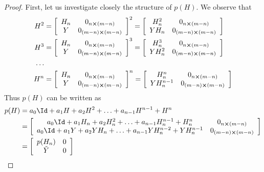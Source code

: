 \begin{proof}
	First, let us investigate closely the structure of \(p(H)\). We observe that
	\begin{align*}
		H^2 &= \left[\begin{array}{cc}
			H_n & 0_{n\cross(m-n)} \\
			Y & 0_{(m-n)\cross(m-n)}
			\end{array}\right]^2 = 
			\left[\begin{array}{cc}
				H_n^2 & 0_{n\cross(m-n)} \\
				Y H_n & 0_{(m-n)\cross(m-n)}
			\end{array}\right]\\
		H^3 &=
			\left[\begin{array}{cc}
				H_n & 0_{n\cross(m-n)} \\
				Y & 0_{(m-n)\cross(m-n)}
			\end{array}\right]^3 = 
			\left[\begin{array}{cc}
				H_n^3 & 0_{n\cross(m-n)} \\
				Y H_n^2 & 0_{(m-n)\cross(m-n)}
			\end{array}\right]\\
			\ldots\\
		H^n &= 			\left[\begin{array}{cc}
			H_n & 0_{n\cross(m-n)} \\
			Y & 0_{(m-n)\cross(m-n)}
		\end{array}\right]^n = 
		\left[\begin{array}{cc}
			H_n^n & 	  0_{n\cross(m-n)} \\
			Y H_n^{n-1} & 0_{(m-n)\cross(m-n)}
		\end{array}\right]\\
	\end{align*}
Thus \(p(H)\) can be written as
\begin{align*}
	p(H) &= a_0 \Id + a_1 H + a_2 H^2 + \ldots + a_{n-1} H^{n-1} + H^n \\
		&= \left[\begin{array}{cc}
			a_0 \Id + a_1 H_n + a_2 H_n^2 + \ldots + a_{n-1} H_n^{n-1} + H_n^n & 0_{n\cross(m-n)}\\
			a_0 \Id + a_1 Y + a_2 Y H_n + \ldots + a_{n-1} Y H_n^{n-2} + Y H_n^{n-1} & 0_{(m-n)\cross(m-n)}
		\end{array}\right]\\
		&= \left[\begin{array}{cc}
			p(H_n) & 0\\
			\tilde{Y} & 0
		\end{array}\right]
\end{align*}

\end{proof}
